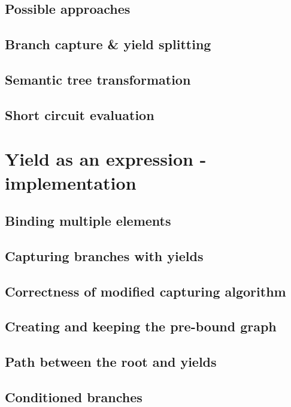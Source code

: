 \subsection{Possible approaches}

\subsection{Branch capture \& yield splitting}

\subsection{Semantic tree transformation}

\subsection{Short circuit evaluation}

\section{Yield as an expression - implementation}

\subsection{Binding multiple elements}

\subsection{Capturing branches with yields}

\subsection{Correctness of modified capturing algorithm}

\subsection{Creating and keeping the pre-bound graph}

\subsection{Path between the root and yields}

\subsection{Conditioned branches}

